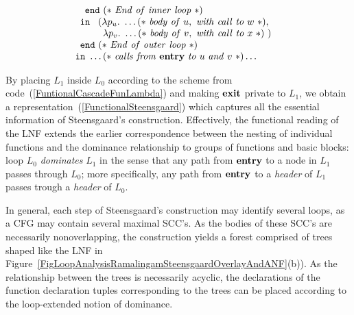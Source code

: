 \begin{equation}
\begin{array}{l}
\begin{array}[t]{l}
\begin{array}[t]{l}
\begin{array}{l}
                        \mathtt{end}\ (*\ \mathit{End\ of\ inner\ loop}\ *)
                     \end{array}\\
                     \mathtt{in}\ 
                     \begin{array}[t]{l}
                       (%
                         \lambda p_u.\ \ldots (*\ \mathit{body\ of}\ u,\ 
                                     \mathit{with\ call\ to}\ w\ *),\\ 
                        \ \, \lambda p_v.\ \ldots (*\ \mathit{body\ of}\ v,\ 
                                            \mathit{with\ call\ to}\ 
                                               x\ *)\ )
                      \end{array}\\
                      \mathtt{end}\ (*\ \mathit{End\ of\ outer\ loop}\ *)
                    \end{array}\\
                    \mathtt{in}\ \ldots (*\ \mathit{calls\ from}\ \entrynode\
                          \mathit{to}\ u\ \mathit{and}\ v\ *) \ldots
         \end{array}
       \end{array}
  \end{equation} 

  By placing $L_1$ inside $L_0$ according to the scheme from
  code~(\ref{FuntionalCascadeFunLambda}) and making $\mathbf{exit}$
  private to $L_1$, we obtain a
  representation~(\ref{FunctionalSteensgaard}) which captures all the
  essential information of Steensgaard's construction. Effectively,
  the functional reading of the LNF extends the earlier correspondence
  between the nesting of individual functions and the dominance
  relationship to groups of functions and basic blocks: loop $L_0$
  \emph{dominates} $L_1$ in the sense that any path from $\mathbf{entry}$
  to a node in $L_1$ passes through $L_0$; more specifically, any path
  from $\mathbf{entry}$ to a \emph{header} of $L_1$ passes trough a
  \emph{header} of $L_0$.

  In general, each step of Steensgaard's construction may identify
  several loops, as a CFG may contain several maximal SCC's. As the
  bodies of these SCC's are necessarily nonoverlapping, the
  construction yields a forest comprised of trees shaped like the LNF
  in
  Figure~\ref{FigLoopAnalysisRamalingamSteensgaardOverlayAndANF}(b)).
  As the relationship between the trees is necessarily acyclic, the
  declarations of the function declaration tuples corresponding to
  the trees can be placed according to the loop-extended notion of
  dominance.


